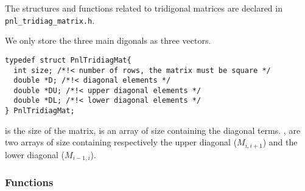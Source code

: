 The structures and functions related to tridigonal matrices are declared in
\verb!pnl_tridiag_matrix.h!. 

We only store the three main digonals as three vectors.

\begin{verbatim}
typedef struct PnlTridiagMat{
  int size; /*!< number of rows, the matrix must be square */
  double *D; /*!< diagonal elements */
  double *DU; /*!< upper diagonal elements */
  double *DL; /*!< lower diagonal elements */
} PnlTridiagMat;
\end{verbatim}

 is the size of the matrix,  is an array of size 
containing the diagonal terms. ,
 are two arrays of size  containing respectively the upper
diagonal ($M_{i, i+1}$) and the lower diagonal ($M_{i-1, i}$). 
\subsubsection{Functions}
